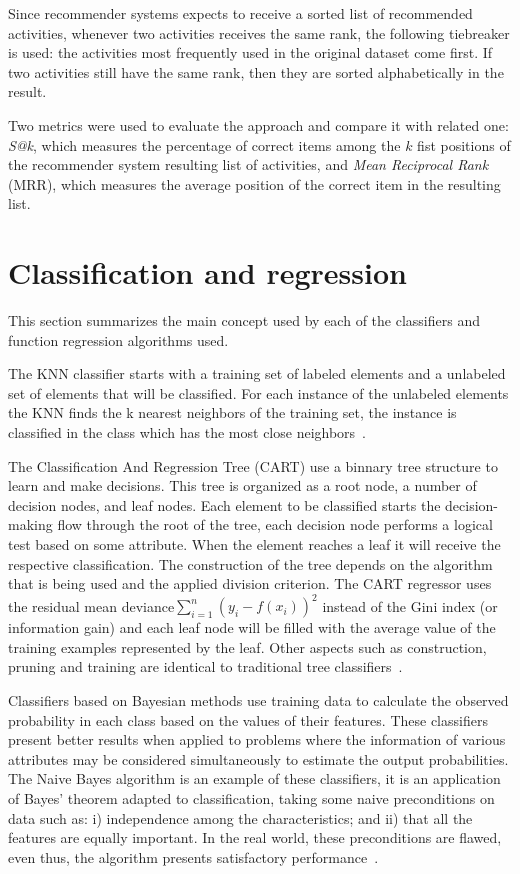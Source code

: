 \documentclass{sig-alternate-05-2015}
\begin{document}
Since recommender systems expects to receive a sorted list of recommended activities, whenever two activities receives the same rank, the following tiebreaker is used: the activities most frequently used in the original dataset come first. If two activities still have the same rank, then they are sorted alphabetically in the result.

Two metrics were used to evaluate the approach and compare it with related one: \emph{S@k}, which measures the percentage of correct items among the $k$ fist positions of the recommender system resulting list of activities, and \emph{Mean Reciprocal Rank} (MRR), which measures the average position of the correct item in the resulting list.

\section{Classification and regression}\label{TECNICAS}
This section summarizes the main concept used by each of the classifiers and function regression algorithms used.

The KNN classifier starts with a training set of labeled elements and a unlabeled set of elements that will be classified. For each instance of the unlabeled elements the KNN finds the k nearest neighbors of the training set, the instance is classified in the class which has the most close neighbors~\cite{MachineLearningwithR2013}.

The Classification And Regression Tree (CART) use a binnary tree structure to learn and make decisions. This tree is organized as a root node, a number of decision nodes, and leaf nodes. Each element to be classified starts the decision-making flow through the root of the tree, each decision node performs a logical test based on some attribute. When the element reaches a leaf it will receive the respective classification. The construction of the tree depends on the algorithm that is being used and the applied division criterion. The CART regressor uses the residual mean deviance\(\sum\limits_{i = 1}^{n}(y_{i} - f(x_{i}))^{2}\) instead of the Gini index (or information gain) and each leaf node will be filled with the average value of the training examples represented by the leaf. Other aspects such as construction, pruning and training are identical to traditional tree classifiers~\cite{Connor2007}.

Classifiers based on Bayesian methods use training data to calculate the observed probability in each class based on the values of their features. These classifiers present better results when applied to problems where the information of various attributes may be considered simultaneously to estimate the output probabilities. The Naive Bayes algorithm is an example of these classifiers, it is an application of Bayes' theorem adapted to classification, taking some naive preconditions on data such as: i) independence among the characteristics; and ii) that all the features are equally important. In the real world, these preconditions are flawed, even thus, the algorithm presents satisfactory performance~\cite{MachineLearningwithR2013}.
\end{document}
